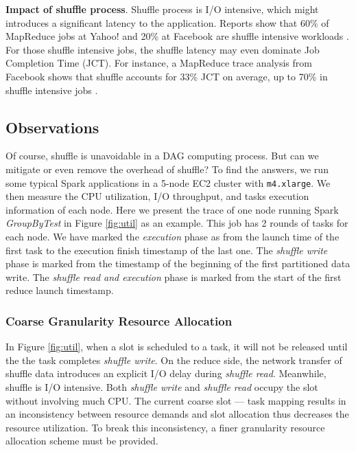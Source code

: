 \textbf{Impact of shuffle process}. Shuffle process is I/O intensive, which might introduces a significant latency to the application. Reports show that 60\% of MapReduce jobs at Yahoo!
and 20\% at Facebook are shuffle intensive workloads \cite{shufflewatcher}. For those shuffle intensive jobs, the shuffle latency may even dominate Job Completion Time (JCT).
For instance, a MapReduce trace analysis from Facebook shows that shuffle accounts for 33\% JCT on average, up to 70\% in shuffle intensive jobs \cite{managing}.


\subsection{Observations} \label{observation}
Of course, shuffle is unavoidable in a DAG computing process. But can we mitigate or even remove the overhead of shuffle? To find the answers, we run some typical Spark applications in a 5-node EC2 cluster with \texttt{m4.xlarge}. We then measure the CPU utilization, I/O throughput, and tasks execution information of each node. Here we present the trace of one node running Spark \textit{GroupByTest} in Figure \ref{fig:util} as an example. This job has 2 rounds of tasks for each node.
We have marked the \textit{execution} phase as from the launch time of the first task to the execution finish timestamp of the last one. The \textit{shuffle write} phase is marked from the timestamp of the beginning of the first partitioned data write. The \textit{shuffle read and execution} phase is marked from the start of the first reduce launch timestamp.



\subsubsection{Coarse Granularity Resource Allocation}
In Figure \ref{fig:util}, when a slot is scheduled to a task, it will not be released until the the task completes \textit{shuffle write}. On the reduce side, the network transfer of shuffle data introduces an explicit I/O delay during \textit{shuffle read}. Meanwhile, shuffle is I/O intensive. Both \textit{shuffle write} and \textit{shuffle read} occupy the slot without involving much CPU. The current coarse slot --- task mapping results in an inconsistency between resource demands and slot allocation thus decreases the resource utilization. To break this inconsistency, a finer granularity resource allocation scheme must be provided.

